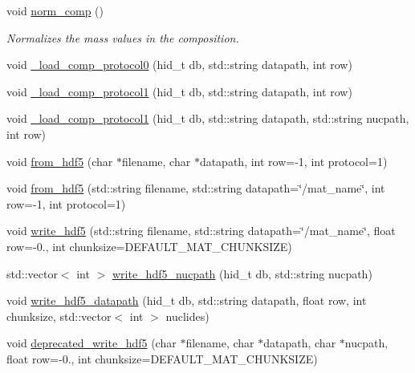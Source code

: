 \begin{DoxyCompactItemize}
\mbox{\label{classpyne_1_1_material_a1d4f70382d3c4ad060977de853d23d6c}} 
void \hyperlink{classpyne_1_1_material_a1d4f70382d3c4ad060977de853d23d6c}{norm\+\_\+comp} ()
\begin{DoxyCompactList}\small\item\em Normalizes the mass values in the composition. \end{DoxyCompactList}\item 
void \hyperlink{classpyne_1_1_material_a53c124ac70017813b4893a2f7fe3db6a}{\+\_\+load\+\_\+comp\+\_\+protocol0} (hid\+\_\+t db, std\+::string datapath, int row)
\item 
void \hyperlink{classpyne_1_1_material_a8b46ba10cebb01cd36a5379e363267b1}{\+\_\+load\+\_\+comp\+\_\+protocol1} (hid\+\_\+t db, std\+::string datapath, int row)
\item 
void \hyperlink{classpyne_1_1_material_af8bdc1a9e08c188dde5683548df5b8c2}{\+\_\+load\+\_\+comp\+\_\+protocol1} (hid\+\_\+t db, std\+::string datapath, std\+::string nucpath, int row)
\item 
void \hyperlink{classpyne_1_1_material_a8f06385fde86492d1291b35fa982c753}{from\+\_\+hdf5} (char $\ast$filename, char $\ast$datapath, int row=-\/1, int protocol=1)
\item 
void \hyperlink{classpyne_1_1_material_a76861ddd80d844c7ee4a556f5bae1020}{from\+\_\+hdf5} (std\+::string filename, std\+::string datapath=\char`\"{}/mat\+\_\+name\char`\"{}, int row=-\/1, int protocol=1)
\item 
void \hyperlink{classpyne_1_1_material_a29d43da68021be93d8d1d1e9915e1179}{write\+\_\+hdf5} (std\+::string filename, std\+::string datapath=\char`\"{}/mat\+\_\+name\char`\"{}, float row=-\/0., int chunksize=D\+E\+F\+A\+U\+L\+T\+\_\+\+M\+A\+T\+\_\+\+C\+H\+U\+N\+K\+S\+I\+ZE)
\item 
std\+::vector$<$ int $>$ \hyperlink{classpyne_1_1_material_a537f99b7d58af344156b13328ff894e2}{write\+\_\+hdf5\+\_\+nucpath} (hid\+\_\+t db, std\+::string nucpath)
\item 
void \hyperlink{classpyne_1_1_material_af94b3fe57ff98a60f7b3ef343a3b9530}{write\+\_\+hdf5\+\_\+datapath} (hid\+\_\+t db, std\+::string datapath, float row, int chunksize, std\+::vector$<$ int $>$ nuclides)
\item 
void \hyperlink{classpyne_1_1_material_a93113f7a182deae73ea406b96c6bfe10}{deprecated\+\_\+write\+\_\+hdf5} (char $\ast$filename, char $\ast$datapath, char $\ast$nucpath, float row=-\/0., int chunksize=D\+E\+F\+A\+U\+L\+T\+\_\+\+M\+A\+T\+\_\+\+C\+H\+U\+N\+K\+S\+I\+ZE)

\end{DoxyCompactItemize}
